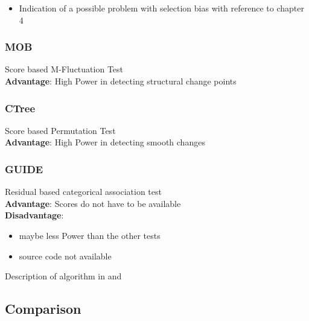 \begin{itemize}
    \item Indication of a possible problem with selection bias with reference to chapter 4
\end{itemize}




\subsubsection{MOB}
Score based M-Fluctuation Test \\
\textbf{Advantage}: High Power in detecting structural change points

\subsubsection{CTree}
Score based Permutation Test \\
\textbf{Advantage}: High Power in detecting smooth changes

\subsubsection{GUIDE}
Residual based categorical association test\\
\textbf{Advantage}: Scores do not have to be available\\
\textbf{Disadvantage}: 
\begin{itemize}
    \item maybe less Power than the other tests
    \item source code not available \citep{Loh.2014}
\end{itemize}

Description of algorithm in \citep{Loh.2009} and \citep{.2002}

\subsection{Comparison}


